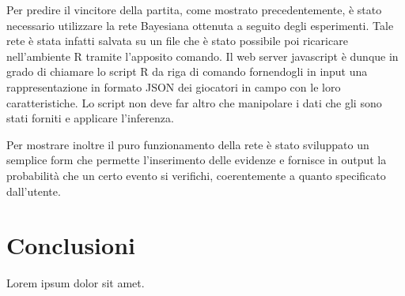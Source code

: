 \documentclass[hidelinks, 12pt]{article}
\begin{document}
Per predire il vincitore della partita, come mostrato precedentemente, è stato necessario utilizzare la rete Bayesiana ottenuta a seguito degli esperimenti. Tale rete è stata infatti salvata su un file che è stato possibile poi ricaricare nell'ambiente R tramite l'apposito comando. Il web server javascript è dunque in grado di chiamare lo script R da riga di comando fornendogli in input una rappresentazione in formato JSON dei giocatori in campo con le loro caratteristiche. Lo script non deve far altro che manipolare i dati che gli sono stati forniti e applicare l'inferenza.

Per mostrare inoltre il puro funzionamento della rete è stato sviluppato un semplice form che permette l'inserimento delle evidenze e fornisce in output la probabilità che un certo evento si verifichi, coerentemente a quanto specificato dall'utente.



\clearpage



\section{Conclusioni}

Lorem ipsum dolor sit amet.




\newpage


	
\end{document}
